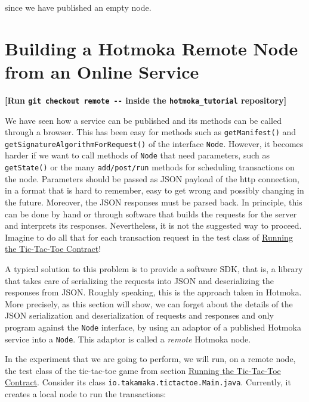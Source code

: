 \documentclass[a4paper,]{book}
\begin{document}
{since we have published an empty node.

\hypertarget{building-a-hotmoka-remote-node-from-an-online-service}{%
\section{Building a Hotmoka Remote Node from an Online Service
}\label{building-a-hotmoka-remote-node-from-an-online-service}}

\textbf{{[}Run \texttt{git\ checkout\ remote\ -\/-} inside the
\texttt{hotmoka\_tutorial} repository{]}}

We have seen how a service can be published and its methods can be
called through a browser. This has been easy for methods such as
\texttt{getManifest()} and \texttt{getSignatureAlgorithmForRequest()} of
the interface \texttt{Node}. However, it becomes harder if we want to
call methods of \texttt{Node} that need parameters, such as
\texttt{getState()} or the many \texttt{add/post/run} methods for
scheduling transactions on the node. Parameters should be passed as JSON
payload of the http connection, in a format that is hard to remember,
easy to get wrong and possibly changing in the future. Moreover, the
JSON responses must be parsed back. In principle, this can be done by
hand or through software that builds the requests for the server and
interprets its responses. Nevertheless, it is not the suggested way to
proceed. Imagine to do all that for each transaction request in the test
class of \protect\hyperlink{running-the-tic-tac-toe-contract}{Running
the Tic-Tac-Toe Contract}!

A typical solution to this problem is to provide a software SDK, that
is, a library that takes care of serializing the requests into JSON and
deserializing the responses from JSON. Roughly speaking, this is the
approach taken in Hotmoka. More precisely, as this section will show, we
can forget about the details of the JSON serialization and
deserialization of requests and responses and only program against the
\texttt{Node} interface, by using an adaptor of a published Hotmoka
service into a \texttt{Node}. This adaptor is called a \emph{remote}
Hotmoka node.

In the experiment that we are going to perform, we will run, on a remote
node, the test class of the tic-tac-toe game from section
\protect\hyperlink{running-the-tic-tac-toe-contract}{Running the
Tic-Tac-Toe Contract}. Consider its class
\texttt{io.takamaka.tictactoe.Main.java}. Currently, it creates a local
node to run the transactions:

}
\end{document}

